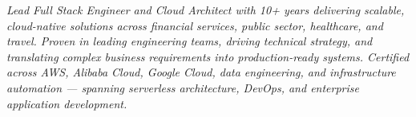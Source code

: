 
\begin{center}
    \colorbox{backgroundgray}{
        \begin{minipage}{0.95\textwidth}
            \centering
            \vspace{6pt}
            \textcolor{textgray}{\textit{Lead Full Stack Engineer and Cloud Architect with 10+ years delivering scalable, cloud-native solutions across financial services, public sector, healthcare, and travel. Proven in leading engineering teams, driving technical strategy, and translating complex business requirements into production-ready systems. Certified across AWS, Alibaba Cloud, Google Cloud, data engineering, and infrastructure automation — spanning serverless architecture, DevOps, and enterprise application development.}}
            \vspace{6pt}
        \end{minipage}
    }
\end{center}
\vspace{6pt}